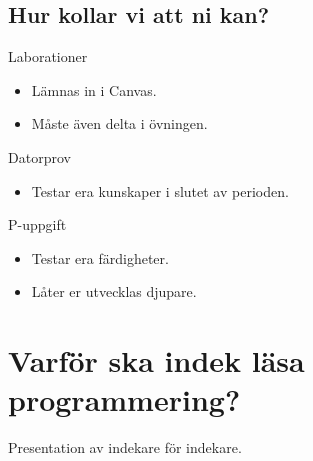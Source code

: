 \subsection{Hur kollar vi att ni kan?}

\begin{frame}
  \begin{block}{Laborationer}
    \begin{itemize}
      \item Lämnas in i Canvas.
      \item Måste även delta i övningen.
    \end{itemize}
  \end{block}

  \pause

  \begin{block}{Datorprov}
    \begin{itemize}
      \item Testar era kunskaper i slutet av perioden.
    \end{itemize}
  \end{block}

  \pause

  \begin{block}{P-uppgift}
    \begin{itemize}
      \item Testar era färdigheter.
      \item Låter er utvecklas djupare.
    \end{itemize}
  \end{block}
\end{frame}



\section{Varför ska indek läsa programmering?}

\begin{frame}
  Presentation av indekare för indekare.
\end{frame}


